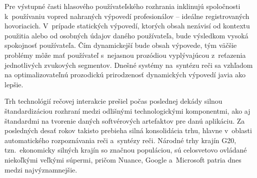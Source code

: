 \begin{multicols}{2}
Pre výstupné časti hlasového používateľského rozhrania inklinujú spoločnosti k~používaniu vopred nahraných výpovedí profesionálov – ideálne registrovaných hovoriacich. V~prípade statických výpovedí, ktorých obsah nezávisí od kontextu použitia alebo od osobných údajov daného používateľa, bude výsledkom vysoká spokojnosť používateľa. Čím dynamickejší bude obsah výpovede, tým väčšie problémy môže mať používateľ s~nejasnou prozódiou vyplývajúcou z~reťazenia jednotlivých zvukových segmentov. Dnešné systémy na~syntézu reči sa vzhľadom na optimalizovateľnú prozodickú prirodzenosť dynamických výpovedí javia ako lepšie. 

Trh technológií rečovej interakcie prešiel počas poslednej dekády silnou štandardizáciou rozhraní medzi odlišnými technologickými komponentmi, ako aj štandardmi na tvorenie daných softvérových artefaktov pre danú aplikáciu. Za posledných desať rokov takisto prebieha silná konsolidácia trhu, hlavne v~oblasti automatického rozpoznávania reči a~syntézy reči. Národné trhy krajín G20, tzn.~ekonomicky silných krajín so značnou populáciou, sú celosvetovo ovládané niekoľkými veľkými súpermi, pričom Nuance, Google a~Microsoft patria dnes medzi najvýznamnejšie.


\end{multicols}
